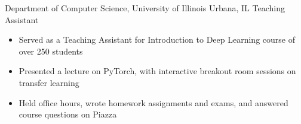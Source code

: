 
        {Department of Computer Science, University of Illinois}
        {Urbana, IL}
        {Teaching Assistant}
        {}{
    \begin{itemize}
        \item Served as a Teaching Assistant for Introduction to Deep Learning course of over 250 students
        \item Presented a lecture on PyTorch, with interactive breakout room sessions on transfer learning
        \item Held office hours, wrote homework assignments and exams, and answered course questions on Piazza
    \end{itemize}
}
